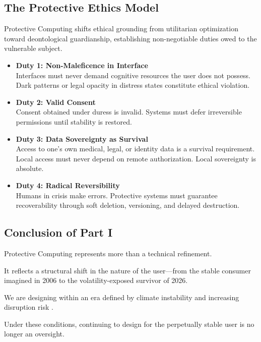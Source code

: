 \documentclass[12pt]{article}
\begin{document}
\subsection{The Protective Ethics Model}
Protective Computing shifts ethical grounding from utilitarian optimization toward deontological guardianship, establishing non-negotiable duties owed to the vulnerable subject.

\begin{itemize}
\item \textbf{Duty 1: Non-Maleficence in Interface}\\
  Interfaces must never demand cognitive resources the user does not possess.
  Dark patterns or legal opacity in distress states constitute ethical violation.

\item \textbf{Duty 2: Valid Consent}\\
  Consent obtained under duress is invalid.
  Systems must defer irreversible permissions until stability is restored.

\item \textbf{Duty 3: Data Sovereignty as Survival}\\
  Access to one's own medical, legal, or identity data is a survival requirement.
  Local access must never depend on remote authorization.
  Local sovereignty is absolute.

\item \textbf{Duty 4: Radical Reversibility}\\
  Humans in crisis make errors.
  Protective systems must guarantee recoverability through soft deletion, versioning, and delayed destruction.
\end{itemize}

\subsection{Conclusion of Part I}
Protective Computing represents more than a technical refinement.

It reflects a structural shift in the nature of the user---from the stable consumer imagined in 2006 to the volatility-exposed survivor of 2026.

We are designing within an era defined by climate instability and increasing disruption risk \cite{IPCC_2023_AR6_Synthesis_SPM}.

Under these conditions, continuing to design for the perpetually stable user is no longer an oversight.
\end{document}
